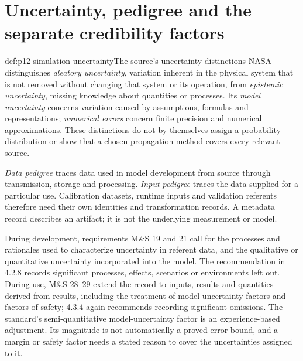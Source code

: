 \section{Uncertainty, pedigree and the separate credibility factors}

\begin{hbdefinition}{def:p12-simulation-uncertainty}{The source's uncertainty distinctions}
NASA distinguishes \emph{aleatory uncertainty}, variation inherent
in the physical system that is not removed without changing that
system or its operation, from \emph{epistemic uncertainty}, missing
knowledge about quantities or processes. Its \emph{model uncertainty}
concerns variation caused by assumptions, formulas and representations;
\emph{numerical errors} concern finite precision and numerical
approximations. These distinctions do not by themselves assign a
probability distribution or show that a chosen propagation method
covers every relevant source.

\emph{Data pedigree} traces data used in model development from
source through transmission, storage and processing. \emph{Input
pedigree} traces the data supplied for a particular use. Calibration
datasets, runtime inputs and validation referents therefore need
their own identities and transformation records. A metadata record
describes an artifact; it is not the underlying measurement or model.
\cite[Section 3.2 and Sections E.3.2, E.4.3--E.4.4]{NASA7009B2024}
\end{hbdefinition}

During development, requirements M\&S 19 and 21 call for the processes
and rationales used to characterize uncertainty in referent data, and
the qualitative or quantitative uncertainty incorporated into the model.
The recommendation in 4.2.8 records significant processes, effects,
scenarios or environments left out. During use, M\&S 28--29 extend
the record to inputs, results and quantities derived from results,
including the treatment of model-uncertainty factors and factors of
safety; 4.3.4 again recommends recording significant omissions.
The standard's semi-quantitative model-uncertainty factor is an
experience-based adjustment. Its magnitude is not automatically
a proved error bound, and a margin or safety factor needs a stated
reason to cover the uncertainties assigned to it.
\cite[Sections 4.2.7--4.2.8 and 4.3.3--4.3.4]{NASA7009B2024}

